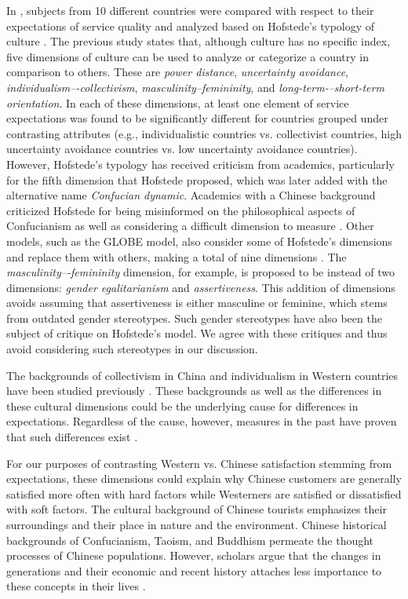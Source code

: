\documentclass[smallextended,natbib]{svjour3}       %
\begin{document}
    In \cite{donthu1998cultural}, subjects from 10 different countries were compared with respect to their expectations of service quality and analyzed based on Hofstede's typology of culture \cite[][]{hofstede1984culture}. The previous study states that, although culture has no specific index, five dimensions of culture can be used to analyze or categorize a country in comparison to others. These are \textit{power distance}, \textit{uncertainty avoidance}, \textit{individualism–-collectivism}, \textit{masculinity–femininity}, and \textit{long-term-–short-term orientation}. In each of these dimensions, at least one element of service expectations was found to be significantly different for countries grouped under contrasting attributes (e.g., individualistic countries vs. collectivist countries, high uncertainty avoidance countries vs. low uncertainty avoidance countries). However, Hofstede's typology has received criticism from academics, particularly for the fifth dimension that Hofstede proposed, which was later added with the alternative name \textit{Confucian dynamic}. Academics with a Chinese background criticized Hofstede for being misinformed on the philosophical aspects of Confucianism as well as considering a difficult dimension to measure \cite[][]{fang2003critique}. Other models, such as the GLOBE model, also consider some of Hofstede's dimensions and replace them with others, making a total of nine dimensions \cite[][]{house1999cultural}. The \textit{masculinity–-femininity} dimension, for example, is proposed to be instead of two dimensions: \textit{gender egalitarianism} and \textit{assertiveness}. This addition of dimensions avoids assuming that assertiveness is either masculine or feminine, which stems from outdated gender stereotypes. Such gender stereotypes have also been the subject of critique on Hofstede's model\cite[][]{jeknic2014gender}. We agree with these critiques and thus avoid considering such stereotypes in our discussion.

    The backgrounds of collectivism in China and individualism in Western countries have been studied previously \cite[][]{gao2017chinese}. These backgrounds as well as the differences in these cultural dimensions could be the underlying cause for differences in expectations. Regardless of the cause, however, measures in the past have proven that such differences exist \cite[][]{armstrong1997importance}. 

    For our purposes of contrasting Western vs. Chinese satisfaction stemming from expectations, these dimensions could explain why Chinese customers are generally satisfied more often with hard factors while Westerners are satisfied or dissatisfied with soft factors. The cultural background of Chinese tourists emphasizes their surroundings and their place in nature and the environment. Chinese historical backgrounds of Confucianism, Taoism, and Buddhism permeate the thought processes of Chinese populations. However, scholars argue that the changes in generations and their economic and recent history attaches less importance to these concepts in their lives \cite[][]{gao2017chinese}. 
\end{document}
